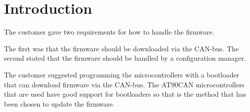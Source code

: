 \section{Introduction}\label{sec:introduction}
The customer gave two requirements for how to handle the firmware.

The first was that the firmware should be downloaded via the CAN-bus. The second stated that the firmware should be handled by a configuration manager.

The customer suggested programming the microcontrollers with a bootloader that can download firmware via the CAN-bus. The AT90CAN microcontrollers that are used have good support for bootloaders so that is the method that has been chosen to update the firmware.


